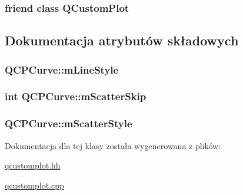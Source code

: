 \subsubsection[{\texorpdfstring{Q\+Custom\+Plot}{QCustomPlot}}]{\setlength{\rightskip}{0pt plus 5cm}friend class {\bf Q\+Custom\+Plot}\hspace{0.3cm}{\ttfamily [friend]}}\hypertarget{class_q_c_p_curve_a1cdf9df76adcfae45261690aa0ca2198}{}\label{class_q_c_p_curve_a1cdf9df76adcfae45261690aa0ca2198}


\subsection{Dokumentacja atrybutów składowych}
\subsubsection[{\texorpdfstring{m\+Line\+Style}{mLineStyle}}]{ Q\+C\+P\+Curve\+::m\+Line\+Style\hspace{0.3cm}{\ttfamily [protected]}}\hypertarget{class_q_c_p_curve_ae1f35ae2b15aee8e15bcdfec5be95156}{}\label{class_q_c_p_curve_ae1f35ae2b15aee8e15bcdfec5be95156}
\subsubsection[{\texorpdfstring{m\+Scatter\+Skip}{mScatterSkip}}]{\setlength{\rightskip}{0pt plus 5cm}int Q\+C\+P\+Curve\+::m\+Scatter\+Skip\hspace{0.3cm}{\ttfamily [protected]}}\hypertarget{class_q_c_p_curve_a990bd5fdeb474459f3f6f5ad0a7b945c}{}\label{class_q_c_p_curve_a990bd5fdeb474459f3f6f5ad0a7b945c}
\subsubsection[{\texorpdfstring{m\+Scatter\+Style}{mScatterStyle}}]{ Q\+C\+P\+Curve\+::m\+Scatter\+Style\hspace{0.3cm}{\ttfamily [protected]}}\hypertarget{class_q_c_p_curve_a08f803b4a30b01bbd7a1eab15d0f864f}{}\label{class_q_c_p_curve_a08f803b4a30b01bbd7a1eab15d0f864f}


Dokumentacja dla tej klasy została wygenerowana z plików\+:\begin{DoxyCompactItemize}
\item 
\hyperlink{qcustomplot_8hh}{qcustomplot.\+hh}\item 
\hyperlink{qcustomplot_8cpp}{qcustomplot.\+cpp}\end{DoxyCompactItemize}
